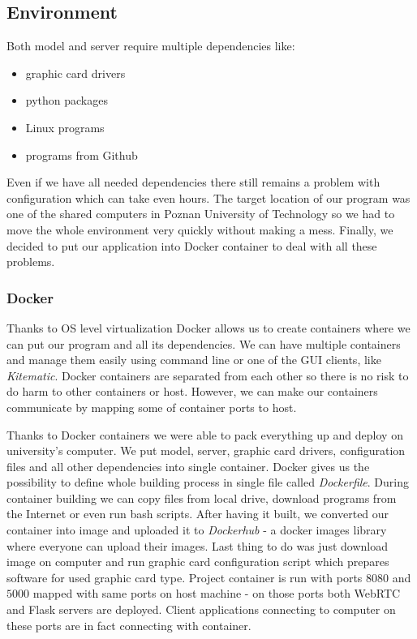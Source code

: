 \documentclass[../Main.tex]{subfiles}
\begin{document}
\subsection{Environment}
    Both model and server require multiple dependencies like:
    \begin{itemize}
        \item graphic card drivers
        \item python packages 
        \item Linux programs
        \item programs from Github
    \end{itemize}
    Even if we have all needed dependencies there still remains a problem with configuration which can take even hours. The target location of our program was one of the shared computers in Poznan University of Technology so we had to move the whole environment very quickly without making a mess. 
    Finally, we decided to put our application into Docker container to deal with all these problems.
    
    \subsubsection{Docker}
    Thanks to OS level virtualization Docker allows us to create containers where we can put our program and all its dependencies. We can have multiple containers and manage them easily using command line or one of the GUI clients, like \textit{Kitematic}. Docker containers are separated from each other so there is no risk to do harm to other containers or host. However, we can make our containers communicate by mapping some of container ports to host.
    
    Thanks to Docker containers we were able to pack everything up and deploy on university's computer.
    We put model, server, graphic card drivers, configuration files and all other dependencies into single container. Docker gives us the possibility to define whole building process in single file called \textit{Dockerfile}. During container building we can copy files from local drive, download programs from the Internet or even run bash scripts. 
    After having it built, we converted our container into image and uploaded it to \textit{Dockerhub} - a docker images library where everyone can upload their images. Last thing to do was just download image on computer and run graphic card configuration script which prepares software for used graphic card type.
    Project container is run with ports $8080$ and $5000$ mapped with same ports on host machine - on those ports both WebRTC and Flask servers are deployed. Client applications connecting to computer on these ports are in fact connecting with container.
    
\end{document}

